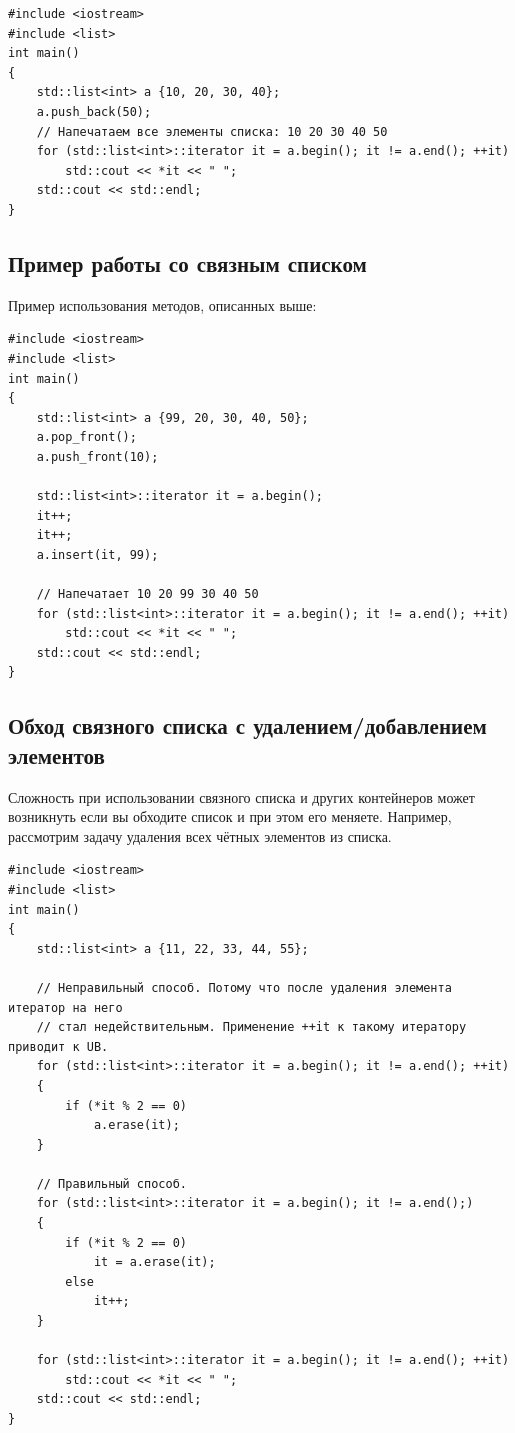 \documentclass{article}
\begin{document}
\begin{lstlisting}
#include <iostream>
#include <list>
int main()
{
    std::list<int> a {10, 20, 30, 40};
    a.push_back(50);
    // Напечатаем все элементы списка: 10 20 30 40 50
    for (std::list<int>::iterator it = a.begin(); it != a.end(); ++it)
        std::cout << *it << " ";
    std::cout << std::endl;    
}
\end{lstlisting}



\subsection*{Пример работы со связным списком}
Пример использования методов, описанных выше:
\begin{lstlisting}
#include <iostream>
#include <list>
int main()
{
    std::list<int> a {99, 20, 30, 40, 50};
    a.pop_front();
    a.push_front(10);
    
    std::list<int>::iterator it = a.begin();
    it++;
    it++;
    a.insert(it, 99);
    
    // Напечатает 10 20 99 30 40 50
    for (std::list<int>::iterator it = a.begin(); it != a.end(); ++it)
        std::cout << *it << " ";
    std::cout << std::endl;    
}
\end{lstlisting}


\subsection*{Обход связного списка с удалением/добавлением элементов}
Сложность при использовании связного списка и других контейнеров может возникнуть если вы обходите список и при этом его меняете. Например, рассмотрим задачу удаления всех чётных элементов из списка.
\begin{lstlisting}
#include <iostream>
#include <list>
int main()
{
    std::list<int> a {11, 22, 33, 44, 55};
    
    // Неправильный способ. Потому что после удаления элемента итератор на него
    // стал недействительным. Применение ++it к такому итератору приводит к UB.
    for (std::list<int>::iterator it = a.begin(); it != a.end(); ++it)
    {
        if (*it % 2 == 0)
            a.erase(it);
    }
    
    // Правильный способ.
    for (std::list<int>::iterator it = a.begin(); it != a.end();)
    {
        if (*it % 2 == 0)
            it = a.erase(it);
        else
            it++;
    }
    
    for (std::list<int>::iterator it = a.begin(); it != a.end(); ++it)
        std::cout << *it << " ";
    std::cout << std::endl;    
}
\end{lstlisting}
\end{document}
